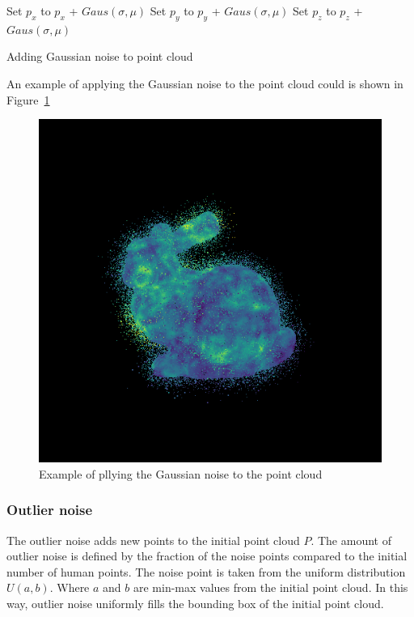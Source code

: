 \begin{algorithm}[H]
\label{alg:gaussian-noise}
\SetAlgoLined
{}
 {
     {
        Set $p_x$ to $p_x$ + $Gaus(\sigma, \mu)$ \;
        Set $p_y$ to $p_y$ + $Gaus(\sigma, \mu)$ \;
        Set $p_z$ to $p_z$ + $Gaus(\sigma, \mu)$ \;
    }
}
\caption{Adding Gaussian noise to point cloud \parencite{uchida_tom-uchidaadd_noise_to_point_cloud_2021}}
\end{algorithm}

An example of applying the Gaussian noise to the point cloud could is shown in Figure~\ref{img:gaussian-noise}

\begin{figure}[htbp]
    \centerline{\includegraphics[scale=.6]{Figures/coords_gaussian.png}}
    \caption{Example of pllying the Gaussian noise to the point cloud \parencite{uchida_tom-uchidaadd_noise_to_point_cloud_2021}}
    \label{img:gaussian-noise}
\end{figure}

\subsubsection{Outlier noise}
The outlier noise adds new points to the initial point cloud $P$. The amount of outlier noise is defined by the fraction of the noise points compared to the initial number of human points. The noise point is taken from the uniform distribution $U(a, b)$. Where $a$ and $b$ are min-max values from the initial point cloud. In this way, outlier noise uniformly fills the bounding box of the initial point cloud.

